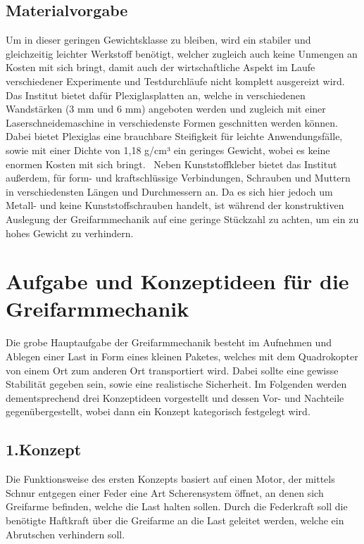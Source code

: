 \subsection{Materialvorgabe}
Um in dieser geringen Gewichtsklasse zu bleiben, wird ein stabiler und gleichzeitig leichter Werkstoff benötigt, welcher zugleich auch keine Unmengen an Kosten mit sich bringt, damit auch der wirtschaftliche Aspekt im Laufe verschiedener Experimente und Testdurchläufe nicht komplett ausgereizt wird. Das Institut bietet dafür Plexiglasplatten an, welche in verschiedenen Wandstärken (3 mm und 6 mm) angeboten werden und zugleich mit einer Laserschneidemaschine in verschiedenste Formen geschnitten werden können. Dabei bietet Plexiglas eine brauchbare Steifigkeit für leichte Anwendungsfälle, sowie mit einer Dichte von 1,18 g/cm³ \cite{PLexiglasdichte} ein geringes Gewicht, wobei es keine enormen Kosten mit sich bringt.
\
Neben Kunststoffkleber bietet das Institut außerdem, für form- und kraftschlüssige Verbindungen, Schrauben und Muttern in verschiedensten Längen und Durchmessern an. Da es sich hier jedoch um Metall- und keine Kunststoffschrauben handelt, ist während der konstruktiven Auslegung der Greifarmmechanik auf eine geringe Stückzahl zu achten, um ein zu hohes Gewicht zu verhindern.

\section{Aufgabe und Konzeptideen für die Greifarmmechanik}
Die grobe Hauptaufgabe der Greifarmmechanik besteht im Aufnehmen und Ablegen einer Last in Form eines kleinen Paketes, welches mit dem Quadrokopter von einem Ort zum anderen Ort transportiert wird. Dabei sollte eine gewisse Stabilität gegeben sein, sowie eine realistische Sicherheit.
Im Folgenden werden dementsprechend drei Konzeptideen vorgestellt und dessen Vor- und Nachteile gegenübergestellt, wobei dann ein Konzept kategorisch festgelegt wird.

\subsection{1.Konzept}
Die Funktionsweise des ersten Konzepts basiert auf einen Motor, der mittels Schnur entgegen einer Feder eine Art Scherensystem öffnet, an denen sich Greifarme befinden, welche die Last halten sollen. Durch die Federkraft soll die benötigte Haftkraft über die Greifarme an die Last geleitet werden, welche ein Abrutschen verhindern soll.

